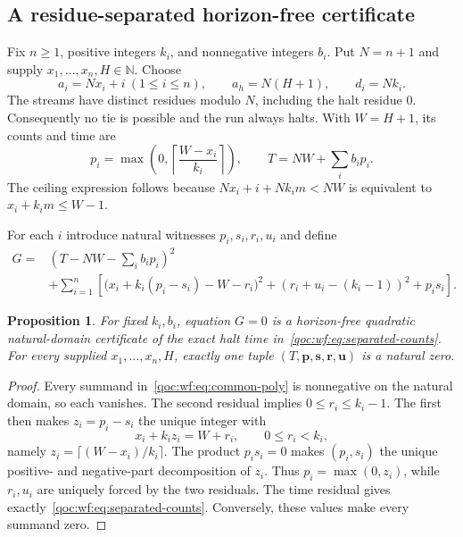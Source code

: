 \documentclass[11pt,letterpaper]{article}
\newtheorem{proposition}[theorem]{Proposition}
\theoremstyle{definition}
\theoremstyle{remark}
\newcommand{\N}{\mathbb N}
\begin{document}
\subsection{A residue-separated horizon-free certificate}
Fix $n\ge1$, positive integers $k_i$, and nonnegative integers $b_i$. Put $N=n+1$ and supply $x_1,\ldots,x_n,H\in\N$. Choose
\begin{equation}\label{qoc:wf:eq:separated}
 a_i=Nx_i+i\ (1\le i\le n),\qquad
 a_h=N(H+1),\qquad d_i=Nk_i.
\end{equation}
The streams have distinct residues modulo $N$, including the halt residue $0$. Consequently no tie is possible and the run always halts. With $W=H+1$, its counts and time are
\begin{equation}\label{qoc:wf:eq:separated-counts}
 p_i=\max\left(0,\left\lceil\frac{W-x_i}{k_i}\right\rceil\right),
 \qquad T=NW+\sum_i b_ip_i.
\end{equation}
The ceiling expression follows because $Nx_i+i+Nk_im<NW$ is equivalent to $x_i+k_im\le W-1$.

For each $i$ introduce natural witnesses $p_i,s_i,r_i,u_i$ and define
\begin{equation}\label{qoc:wf:eq:common-poly}
\begin{split}
 G={}&\left(T-NW-\sum_i b_ip_i\right)^2\\
 &+\sum_{i=1}^n\left[
 \bigl(x_i+k_i(p_i-s_i)-W-r_i\bigr)^2
 +(r_i+u_i-(k_i-1))^2+p_is_i\right].
\end{split}
\end{equation}

\begin{proposition}\label{qoc:wf:prop:common-poly}
For fixed $k_i,b_i$, equation $G=0$ is a horizon-free quadratic natural-domain certificate of the exact halt time in~\eqref{qoc:wf:eq:separated-counts}. For every supplied $x_1,\ldots,x_n,H$, exactly one tuple $(T,\mathbf p,\mathbf s,\mathbf r,\mathbf u)$ is a natural zero.
\end{proposition}
\begin{proof}
Every summand in~\eqref{qoc:wf:eq:common-poly} is nonnegative on the natural domain, so each vanishes. The second residual implies $0\le r_i\le k_i-1$. The first then makes $z_i=p_i-s_i$ the unique integer with
\[
 x_i+k_iz_i=W+r_i,\qquad 0\le r_i<k_i,
\]
namely $z_i=\lceil(W-x_i)/k_i\rceil$. The product $p_is_i=0$ makes $(p_i,s_i)$ the unique positive- and negative-part decomposition of $z_i$. Thus $p_i=\max(0,z_i)$, while $r_i,u_i$ are uniquely forced by the two residuals. The time residual gives exactly~\eqref{qoc:wf:eq:separated-counts}. Conversely, these values make every summand zero.
\end{proof}
\end{document}
